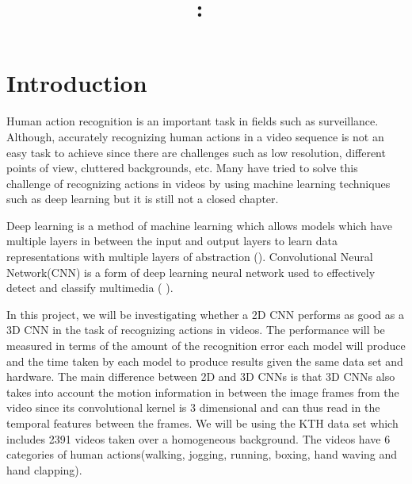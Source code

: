 \title{
\vspace{2in}
\textmd{\textbf{\hmwkClass:\ \hmwkTitle}}\\
\vspace{3in}
}
\author{\textbf{\hmwkAuthorName}}


 


\maketitle
\newpage
\section{Introduction}
 \vspace{0.1in}
 \par
Human action recognition is an important task in fields such as surveillance. Although, accurately recognizing human  actions in a video sequence is not an easy task to achieve since there are challenges such as low resolution, different points of view, cluttered backgrounds, etc. Many have tried to solve this challenge of recognizing actions in videos by using machine learning techniques such as deep learning but it is still not a closed chapter. \vspace{0.1in}

Deep learning is a method of machine learning which allows models which have multiple layers in between the input and output layers to learn data representations with multiple layers of abstraction (\cite{lecun2015deep}). Convolutional Neural Network(CNN) is a form of deep learning neural network used to effectively detect and classify multimedia (\cite{lecun2015deep} ). \vspace{0.1in}

In this project, we will be investigating whether a 2D CNN performs as good as a 3D CNN in the task of recognizing actions in videos. The performance will be measured in terms of the amount of the recognition error each model will produce and the time taken by each model to produce results given the same data set and hardware. The main difference between 2D and 3D CNNs is that 3D CNNs also takes into account the motion information in between the image frames from the video since its convolutional kernel is 3 dimensional and can thus read in the temporal features between the frames. We will be using the KTH data set which includes 2391 videos taken over a homogeneous background. The videos have 6 categories of human actions(walking, jogging, running, boxing, hand waving and hand clapping).

